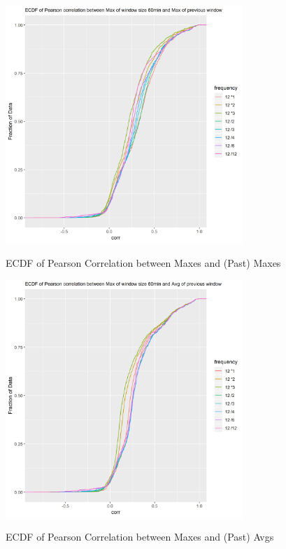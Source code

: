 \documentclass{article}
\begin{document}
\begin{figure}[htbp]
\caption{ECDF of Pearson Correlation between Maxes and (Past) Maxes}
\centering
\includegraphics[width = 0.8\textwidth]{ECDFofPearsoncorrelationbetweenMaxofwindowsize60minandMaxofpreviouswindow}
\label{fig:fig1.1.4}
\end{figure}

\begin{figure}[htbp]
\caption{ECDF of Pearson Correlation between Maxes and (Past) Avgs}
\centering
\includegraphics[width = 0.8\textwidth]{ECDFofPearsoncorrelationbetweenMaxofwindowsize60minandAvgofpreviouswindow}
\label{fig:fig1.1.5}
\end{figure}
\end{document}
